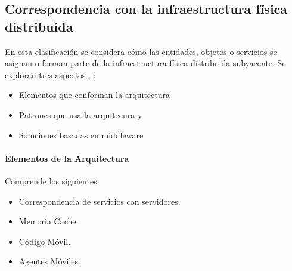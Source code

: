 \subsection{Correspondencia con la infraestructura física distribuida}
\label{subsec:corresp}

En esta clasificaci\'on se considera  cómo las entidades, objetos o servicios se asignan o forman parte de la infraestructura física distribuida subyacente. Se exploran tres aspectos , :

\begin{itemize}
	\item Elementos que conforman la arquitectura
	\item Patrones que usa la arquitecura  y
	\item Soluciones basadas en middleware 
\end{itemize}


\paragraph{Elementos de la Arquitectura}
		\begin{kaobox}[frametitle= Elementos de la Arquitectura]
			Comprende los siguientes 
			\begin{itemize}
				\item Correspondencia de servicios con servidores.  				
				\item Memoria Cache.
				\item Código Móvil.
				\item Agentes Móviles.
		\end{itemize} 	\end{kaobox} 
	 
